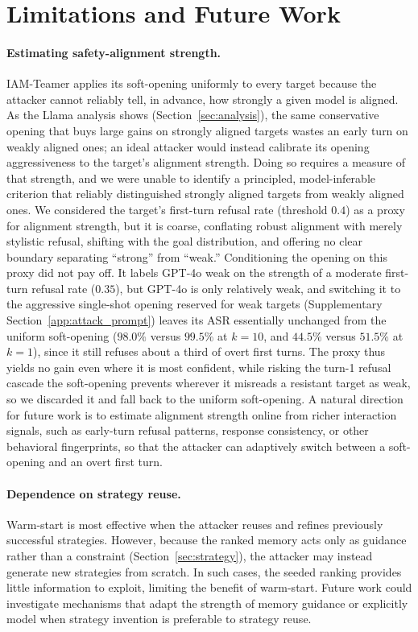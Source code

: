 \section{Limitations and Future Work}
\label{sec:limitations}

\paragraph{Estimating safety-alignment strength.}
IAM-Teamer applies its soft-opening uniformly to every target because the attacker cannot reliably tell, in advance, how strongly a given model is aligned.
As the Llama analysis shows (Section~\ref{sec:analysis}), the same conservative opening that buys large gains on strongly aligned targets wastes an early turn on weakly aligned ones; an ideal attacker would instead calibrate its opening aggressiveness to the target's alignment strength.
Doing so requires a measure of that strength, and we were unable to identify a principled, model-inferable criterion that reliably distinguished strongly aligned targets from weakly aligned ones.
We considered the target's first-turn refusal rate (threshold $0.4$) as a proxy for alignment strength, but it is coarse, conflating robust alignment with merely stylistic refusal, shifting with the goal distribution, and offering no clear boundary separating ``strong'' from ``weak.''
Conditioning the opening on this proxy did not pay off.
It labels GPT-4o weak on the strength of a moderate first-turn refusal rate ($0.35$), but GPT-4o is only relatively weak, and switching it to the aggressive single-shot opening reserved for weak targets (Supplementary Section~\ref{app:attack_prompt}) leaves its ASR essentially unchanged from the uniform soft-opening ($98.0\%$ versus $99.5\%$ at $k{=}10$, and $44.5\%$ versus $51.5\%$ at $k{=}1$), since it still refuses about a third of overt first turns.
The proxy thus yields no gain even where it is most confident, while risking the turn-1 refusal cascade the soft-opening prevents wherever it misreads a resistant target as weak, so we discarded it and fall back to the uniform soft-opening.
A natural direction for future work is to estimate alignment strength online from richer interaction signals, such as early-turn refusal patterns, response consistency, or other behavioral fingerprints, so that the attacker can adaptively switch between a soft-opening and an overt first turn.

\paragraph{Dependence on strategy reuse.}
Warm-start is most effective when the attacker reuses and refines previously successful strategies.
However, because the ranked memory acts only as guidance rather than a constraint (Section~\ref{sec:strategy}), the attacker may instead generate new strategies from scratch.
In such cases, the seeded ranking provides little information to exploit, limiting the benefit of warm-start.
Future work could investigate mechanisms that adapt the strength of memory guidance or explicitly model when strategy invention is preferable to strategy reuse.

